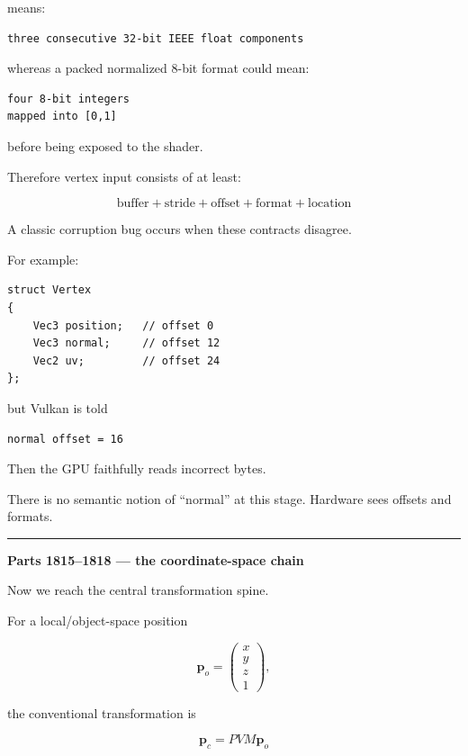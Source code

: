 means:

\begin{verbatim}
three consecutive 32-bit IEEE float components
\end{verbatim}

whereas a packed normalized 8-bit format could mean:

\begin{verbatim}
four 8-bit integers
mapped into [0,1]
\end{verbatim}

before being exposed to the shader.

Therefore vertex input consists of at least:

\[
\boxed{\text{buffer}+\text{stride}+\text{offset}+\text{format}+\text{location}}
\]

A classic corruption bug occurs when these contracts disagree.

For example:

\begin{verbatim}
struct Vertex
{
    Vec3 position;   // offset 0
    Vec3 normal;     // offset 12
    Vec2 uv;         // offset 24
};
\end{verbatim}

but Vulkan is told

\begin{verbatim}
normal offset = 16
\end{verbatim}

Then the GPU faithfully reads incorrect bytes.

There is no semantic notion of ``normal'' at this stage. Hardware sees offsets and formats.

\begin{center}\rule{0.5\linewidth}{0.5pt}\end{center}

\textbf{Parts 1815--1818 --- the coordinate-space chain}

Now we reach the central transformation spine.

For a local/object-space position

\[
\mathbf p_o=
\begin{pmatrix}
x\\y\\z\\1
\end{pmatrix},
\]

the conventional transformation is

\[
\boxed{
\mathbf p_c
=
PVM\mathbf p_o
}
\]

